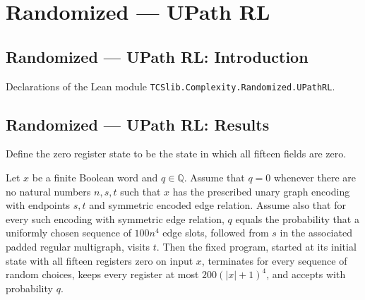 \section{Randomized --- UPath RL}
\subsection*{Randomized --- UPath RL: Introduction}

Declarations of the Lean module \texttt{TCSlib.Complexity.Randomized.UPathRL}.

\subsection*{Randomized --- UPath RL: Results}

\begin{definition}
\label{Complexity.LogProg.UReg.zero}
\leanok
{}
Define the zero register state to be the state in which all fifteen fields are zero.
\end{definition}

\begin{theorem}
\label{Complexity.LogProg.ups_start}
\leanok
{}
Let $x$ be a finite Boolean word and $q\in\mathbb{Q}$. Assume that $q=0$ whenever there
are no natural numbers $n,s,t$ such that $x$ has the prescribed unary graph encoding
with endpoints $s,t$ and symmetric encoded edge relation. Assume also that for every
such encoding with symmetric edge relation, $q$ equals the probability that a uniformly
chosen sequence of $100n^4$ edge slots, followed from $s$ in the associated padded
regular multigraph, visits $t$. Then the fixed program, started at its initial state
with all fifteen registers zero on input $x$, terminates for every sequence of random
choices, keeps every register at most $200(|x|+1)^4$, and accepts with probability $q$.
\end{theorem}

